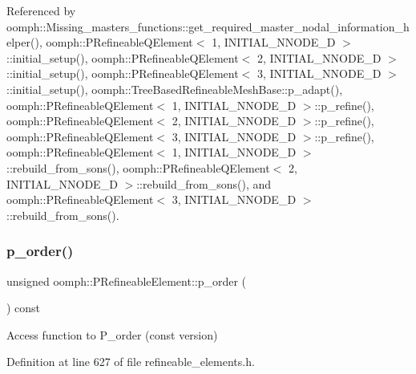 Referenced by oomph\+::\+Missing\+\_\+masters\+\_\+functions\+::get\+\_\+required\+\_\+master\+\_\+nodal\+\_\+information\+\_\+helper(), oomph\+::\+P\+Refineable\+Q\+Element$<$ 1, I\+N\+I\+T\+I\+A\+L\+\_\+\+N\+N\+O\+D\+E\+\_\+D $>$\+::initial\+\_\+setup(), oomph\+::\+P\+Refineable\+Q\+Element$<$ 2, I\+N\+I\+T\+I\+A\+L\+\_\+\+N\+N\+O\+D\+E\+\_\+D $>$\+::initial\+\_\+setup(), oomph\+::\+P\+Refineable\+Q\+Element$<$ 3, I\+N\+I\+T\+I\+A\+L\+\_\+\+N\+N\+O\+D\+E\+\_\+D $>$\+::initial\+\_\+setup(), oomph\+::\+Tree\+Based\+Refineable\+Mesh\+Base\+::p\+\_\+adapt(), oomph\+::\+P\+Refineable\+Q\+Element$<$ 1, I\+N\+I\+T\+I\+A\+L\+\_\+\+N\+N\+O\+D\+E\+\_\+D $>$\+::p\+\_\+refine(), oomph\+::\+P\+Refineable\+Q\+Element$<$ 2, I\+N\+I\+T\+I\+A\+L\+\_\+\+N\+N\+O\+D\+E\+\_\+D $>$\+::p\+\_\+refine(), oomph\+::\+P\+Refineable\+Q\+Element$<$ 3, I\+N\+I\+T\+I\+A\+L\+\_\+\+N\+N\+O\+D\+E\+\_\+D $>$\+::p\+\_\+refine(), oomph\+::\+P\+Refineable\+Q\+Element$<$ 1, I\+N\+I\+T\+I\+A\+L\+\_\+\+N\+N\+O\+D\+E\+\_\+D $>$\+::rebuild\+\_\+from\+\_\+sons(), oomph\+::\+P\+Refineable\+Q\+Element$<$ 2, I\+N\+I\+T\+I\+A\+L\+\_\+\+N\+N\+O\+D\+E\+\_\+D $>$\+::rebuild\+\_\+from\+\_\+sons(), and oomph\+::\+P\+Refineable\+Q\+Element$<$ 3, I\+N\+I\+T\+I\+A\+L\+\_\+\+N\+N\+O\+D\+E\+\_\+D $>$\+::rebuild\+\_\+from\+\_\+sons().

\mbox{\label{classoomph_1_1PRefineableElement_ad1c4ca3d701eaca833fc9404b068c8f7}} 
\subsubsection{\texorpdfstring{p\+\_\+order()}{p\_order()}\hspace{0.1cm}{\footnotesize\ttfamily [2/2]}}
{\footnotesize\ttfamily unsigned oomph\+::\+P\+Refineable\+Element\+::p\+\_\+order (\begin{DoxyParamCaption}{ }\end{DoxyParamCaption}) const\hspace{0.3cm}{\ttfamily [inline]}}



Access function to P\+\_\+order (const version) 



Definition at line 627 of file refineable\+\_\+elements.\+h.

